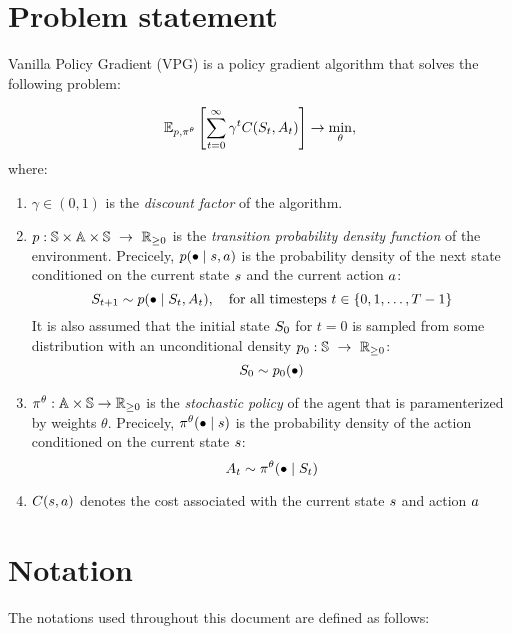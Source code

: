 \documentclass[12pt,twoside]{../../mitthesis}
\begin{document}
\section*{Problem statement}
Vanilla Policy Gradient (VPG) is a policy gradient algorithm that solves the following problem:

\begin{equation}
    \label{eqn_ppo_problem}
    \E[\transit, \policy^{\theta}]{\sum_{t = 0}^{\infty} \gamma ^ t \Cost(\State_{t}, \Action_{t})} \ra \min_{\theta},
\end{equation}
where:
\begin{enumerate}
    \item $\gamma \in (0, 1)$ is the \textit{discount factor} of the algorithm. 
    \item  $p : \mathbb S \times \mathbb A \times \mathbb S \ \rightarrow \ {\mathbb{R}}_{\geq 0}$ is the \textit{transition probability density function} of the environment. Precicely,  $p(\bullet \mid s, a)$ is the probability density of the next state conditioned on the current state $s$ and the current action $a$:
    $$
        S_{t+1} \sim p(\bullet \mid S_t, A_t), \quad \text{for all timesteps } t \in \{0, 1, \dots, T-1\} 
    $$
    It is also assumed that the initial state $S_0$ for $t = 0$ is sampled from some distribution with an unconditional density $p_0 : \mathbb S \ \rightarrow \ {\mathbb{R}}_{\geq 0}$:
    $$
        S_0 \sim p_0(\bullet)
    $$
    \item $\pi^{\theta} : \mathbb A \times \mathbb S \rightarrow {\mathbb{R}}_{\geq 0}$ is the \textit{stochastic policy} of the agent that is paramenterized by weights $\theta$. Precicely, $\pi^{\theta}(\bullet \mid s)$ is the probability density of the action conditioned on the current state $s$:
    $$
        A_t \sim \pi^{\theta}(\bullet \mid S_t)
    $$
    \item $C(s, a)$ denotes the cost associated with the current state $s$ and action $a$
\end{enumerate}

\section*{Notation}
The notations used throughout this document are defined as follows:
\end{document}
